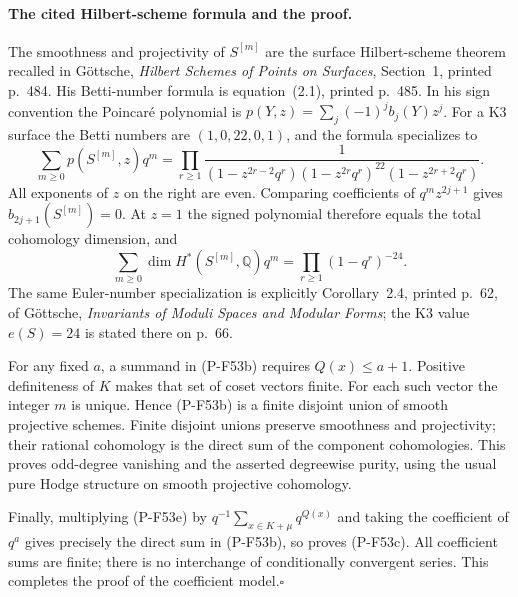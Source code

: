 \paragraph{The cited Hilbert-scheme formula and the proof.}
The smoothness and projectivity of $S^{[m]}$ are the
surface Hilbert-scheme theorem recalled in G\"ottsche,
\emph{Hilbert Schemes of Points on Surfaces}, Section~1,
printed p.~484. His Betti-number formula is equation~(2.1),
printed p.~485. In his sign convention the Poincar\'e
polynomial is $p(Y,z)=\sum_j(-1)^jb_j(Y)z^j$.
For a K3 surface the Betti numbers are $(1,0,22,0,1)$,
and the formula specializes to
\[
 \sum_{m\ge0}p(S^{[m]},z)q^m
 =\prod_{r\ge1}
   \frac1{(1-z^{2r-2}q^r)
           (1-z^{2r}q^r)^{22}
           (1-z^{2r+2}q^r)}.
                                                        \tag{P-F53d}
\]
All exponents of $z$ on the right are even. Comparing
coefficients of $q^m z^{2j+1}$ gives
$b_{2j+1}(S^{[m]})=0$.
At $z=1$ the signed polynomial therefore equals the
total cohomology dimension, and
\[
 \sum_{m\ge0}\dim H^*(S^{[m]},\mathbb Q)q^m
                   =\prod_{r\ge1}(1-q^r)^{-24}.
                                                        \tag{P-F53e}
\]
The same Euler-number specialization is explicitly
Corollary~2.4, printed p.~62, of G\"ottsche,
\emph{Invariants of Moduli Spaces and Modular Forms};
the K3 value $e(S)=24$ is stated there on p.~66.

For any fixed $a$, a summand in (P-F53b) requires
$Q(x)\le a+1$. Positive definiteness of $K$ makes that
set of coset vectors finite. For each such vector the
integer $m$ is unique. Hence (P-F53b) is a finite
disjoint union of smooth projective schemes. Finite
disjoint unions preserve smoothness and projectivity;
their rational cohomology is the direct sum of the
component cohomologies. This proves odd-degree
vanishing and the asserted degreewise purity, using
the usual pure Hodge structure on smooth projective
cohomology.

Finally, multiplying (P-F53e) by
$q^{-1}\sum_{x\in K+\mu}q^{Q(x)}$ and taking the
coefficient of $q^a$ gives precisely the direct sum
in (P-F53b), so proves (P-F53c). All coefficient sums
are finite; there is no interchange of conditionally
convergent series. This completes the proof of the
coefficient model.\hfill$\square$

